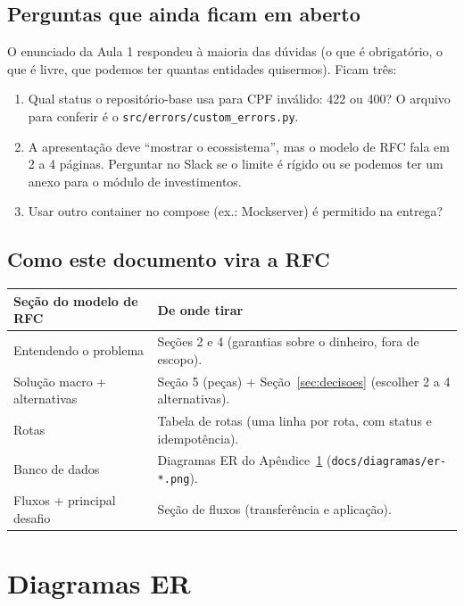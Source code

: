 \documentclass[11pt,a4paper]{article}
\newcommand{\tb}[1]{\texttt{#1}}           %
\begin{document}
\subsection{Perguntas que ainda ficam em aberto}

O enunciado da Aula 1 respondeu à maioria das dúvidas (o que é obrigatório, o que é livre, que
podemos ter quantas entidades quisermos). Ficam três:

\begin{enumerate}
  \item Qual status o repositório-base usa para CPF inválido: 422 ou 400? O arquivo para
        conferir é o \tb{src/errors/custom_errors.py}.
  \item A apresentação deve ``mostrar o ecossistema'', mas o modelo de RFC fala em 2 a 4 páginas.
        Perguntar no Slack se o limite é rígido ou se podemos ter um anexo para o módulo de
        investimentos.
  \item Usar outro container no compose (ex.: Mockserver) é permitido na entrega?
\end{enumerate}

\subsection{Como este documento vira a RFC}

\begin{tabularx}{\linewidth}{@{}P{5.2cm}X@{}}
\toprule
\textbf{Seção do modelo de RFC} & \textbf{De onde tirar} \\
\midrule
Entendendo o problema & Seções 2 e 4 (garantias sobre o dinheiro, fora de escopo). \\
Solução macro + alternativas & Seção 5 (peças) + Seção~\ref{sec:decisoes} (escolher 2 a 4 alternativas). \\
Rotas & Tabela de rotas (uma linha por rota, com status e idempotência). \\
Banco de dados & Diagramas ER do Apêndice~\ref{ap:mermaid} (\tb{docs/diagramas/er-*.png}). \\
Fluxos + principal desafio & Seção de fluxos (transferência e aplicação). \\
\bottomrule
\end{tabularx}

\appendix
\section{Diagramas ER}\label{ap:mermaid}
\end{document}
